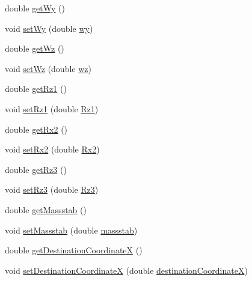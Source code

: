 \begin{DoxyCompactItemize}
\item 
double \hyperlink{classparams_1_1_control_parms_a892195e5364a123dbf317acf782eb2e9}{get\+Wy} ()
\item 
void \hyperlink{classparams_1_1_control_parms_a62167ea52e9ae9c67bdd7f01d84d9338}{set\+Wy} (double \hyperlink{classparams_1_1_control_parms_a35defe66635bc8e2aaa05c146dc5e4ac}{wy})
\item 
double \hyperlink{classparams_1_1_control_parms_a3968b56fc06aae0f01a3e3cc0bf5d7fc}{get\+Wz} ()
\item 
void \hyperlink{classparams_1_1_control_parms_a79521a33aa8a2e38aba29e77ce052714}{set\+Wz} (double \hyperlink{classparams_1_1_control_parms_ad948128a938b351f23b1d7aee4ae1cb3}{wz})
\item 
double \hyperlink{classparams_1_1_control_parms_afd005a609a5850cce818d703c6d7d0ee}{get\+Rz1} ()
\item 
void \hyperlink{classparams_1_1_control_parms_a4c0dc142e134c041a8a4c571051135db}{set\+Rz1} (double \hyperlink{classparams_1_1_control_parms_a0501dbc13102eff28a1e15e005e73c26}{Rz1})
\item 
double \hyperlink{classparams_1_1_control_parms_a0f81b48dce0456c2c3e558d816cd6421}{get\+Rx2} ()
\item 
void \hyperlink{classparams_1_1_control_parms_aa4ed8164ad987716fb33b950698717ae}{set\+Rx2} (double \hyperlink{classparams_1_1_control_parms_af114ca71c4fdd82a3f056807591efdb0}{Rx2})
\item 
double \hyperlink{classparams_1_1_control_parms_a1a21b81af2b6f4b8e6b4384fc4fc3147}{get\+Rz3} ()
\item 
void \hyperlink{classparams_1_1_control_parms_adb205b83347ef1c8b3996976cb9994d4}{set\+Rz3} (double \hyperlink{classparams_1_1_control_parms_a60fdffbd1fadf6b1a7a0372939337131}{Rz3})
\item 
double \hyperlink{classparams_1_1_control_parms_aa58394ff038d3975c7978196f501ac20}{get\+Massstab} ()
\item 
void \hyperlink{classparams_1_1_control_parms_afafdea373a656d6dec1f39d7abfe4bf7}{set\+Massstab} (double \hyperlink{classparams_1_1_control_parms_a7d7e220c8bacb270d2f0760b4230df04}{massstab})
\item 
double \hyperlink{classparams_1_1_control_parms_aa23beea311a95495623a6940fb190361}{get\+Destination\+CoordinateX} ()
\item 
void \hyperlink{classparams_1_1_control_parms_a9cb313fe0bdb0301e97f6270420960ac}{set\+Destination\+CoordinateX} (double \hyperlink{classparams_1_1_control_parms_aeaf9b43a90b6126041788042b28951be}{destination\+CoordinateX})

\end{DoxyCompactItemize}
